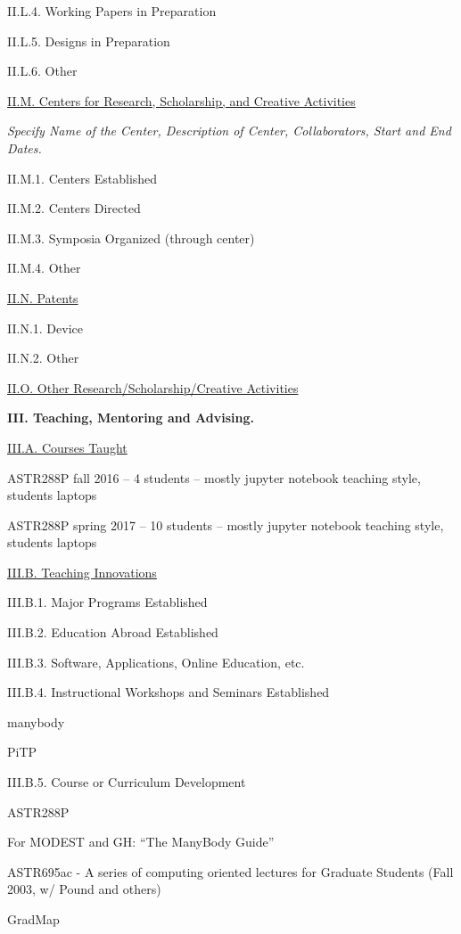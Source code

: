 \documentclass[11pt,letterpaper]{article}
\begin{document}
II.L.4. Working Papers in Preparation

II.L.5. Designs in Preparation

II.L.6. Other


\underline{II.M. Centers for Research, Scholarship, and Creative Activities}

\textit{Specify Name of the Center, Description of Center, Collaborators, Start and End Dates.}

II.M.1. Centers Established

II.M.2. Centers Directed

II.M.3. Symposia Organized (through center)

II.M.4. Other


\underline{II.N. Patents}

II.N.1. Device

II.N.2. Other


\underline{II.O. Other Research/Scholarship/Creative Activities}


\textbf{III. Teaching, Mentoring and Advising.}


\underline{III.A. Courses Taught}


ASTR288P fall 2016 --  4 students -- mostly jupyter notebook teaching style, students laptops

ASTR288P spring 2017 -- 10 students -- mostly jupyter notebook teaching style, students laptops


\underline{III.B. Teaching Innovations}

III.B.1. Major Programs Established

III.B.2. Education Abroad Established
 
III.B.3. Software, Applications, Online Education, etc.

III.B.4. Instructional Workshops and Seminars Established

manybody

PiTP

III.B.5. Course or Curriculum Development

ASTR288P

For MODEST and GH: ``The ManyBody Guide''

ASTR695ac - A series of computing oriented lectures for Graduate Students (Fall 2003, w/ Pound and others)

GradMap 
\end{document}
